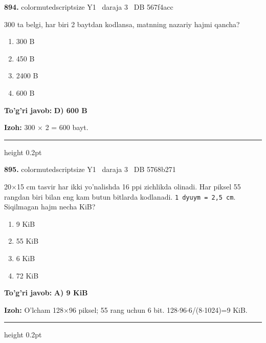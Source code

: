 \documentclass[10pt,a4paper,oneside]{article}
\begin{document}
\noindent\textbf{\color{ink}894.}  {color{muted}scriptsize Y1 \textbullet\ daraja 3 \textbullet\ DB 567f4acc}
\par
300 ta belgi, har biri 2 baytdan kodlansa, matnning nazariy hajmi qancha?
\begin{enumerate}[label=\Alph*),leftmargin=9mm]
\item 300 B
\item 450 B
\item 2400 B
\item 600 B
\end{enumerate}
\begin{tcolorbox}[enhanced,breakable,colback=teal!4,colframe=teal!50!black,boxrule=0.5pt,arc=1.1mm,left=3mm,right=3mm,top=1.7mm,bottom=1.7mm,before skip=2mm,after skip=2mm]
\textbf{\color{teal}To'g'ri javob:} \textbf{D) 600 B}
\par\smallskip
\textbf{Izoh:} 300 \ensuremath{\times} 2 = 600 bayt.
\end{tcolorbox}
\vspace{2mm}\hrule height 0.2pt \vspace{3mm}

\noindent\textbf{\color{ink}895.}  {color{muted}scriptsize Y1 \textbullet\ daraja 3 \textbullet\ DB 5768b271}
\par
20\ensuremath{\times}15 cm tasvir har ikki yo'nalishda 16 ppi zichlikda olinadi. Har piksel 55 rangdan biri bilan eng kam butun bitlarda kodlanadi. \texttt{1 dyuym = 2,5 cm}. Siqilmagan hajm necha KiB?
\begin{enumerate}[label=\Alph*),leftmargin=9mm]
\item 9 KiB
\item 55 KiB
\item 6 KiB
\item 72 KiB
\end{enumerate}
\begin{tcolorbox}[enhanced,breakable,colback=teal!4,colframe=teal!50!black,boxrule=0.5pt,arc=1.1mm,left=3mm,right=3mm,top=1.7mm,bottom=1.7mm,before skip=2mm,after skip=2mm]
\textbf{\color{teal}To'g'ri javob:} \textbf{A) 9 KiB}
\par\smallskip
\textbf{Izoh:} O'lcham 128\ensuremath{\times}96 piksel; 55 rang uchun 6 bit. 128\ensuremath{\cdot}96\ensuremath{\cdot}6/(8\ensuremath{\cdot}1024)=9 KiB.
\end{tcolorbox}
\vspace{2mm}\hrule height 0.2pt \vspace{3mm}
\end{document}

